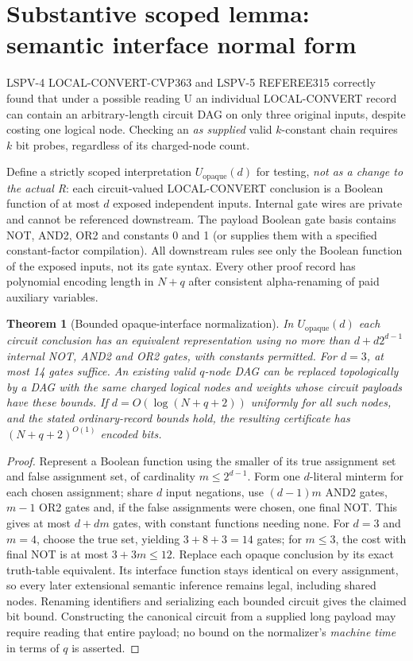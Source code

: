 \documentclass[11pt]{article}
\newtheorem{theorem}{Theorem}
\begin{document}
\section*{Substantive scoped lemma: semantic interface normal form}
LSPV-4 LOCAL-CONVERT-CVP363 and LSPV-5 REFEREE315 correctly found that under a possible reading U an individual LOCAL-CONVERT record can contain an arbitrary-length circuit DAG on only three original inputs, despite costing one logical node. Checking an \emph{as supplied} valid $k$-constant chain requires $k$ bit probes, regardless of its charged-node count.

Define a strictly scoped interpretation $U_{\mathrm{opaque}}(d)$ for testing, \emph{not as a change to the actual R}: each circuit-valued LOCAL-CONVERT conclusion is a Boolean function of at most $d$ exposed independent inputs. Internal gate wires are private and cannot be referenced downstream. The payload Boolean gate basis contains NOT, AND2, OR2 and constants 0 and 1 (or supplies them with a specified constant-factor compilation). All downstream rules see only the Boolean function of the exposed inputs, not its gate syntax. Every other proof record has polynomial encoding length in $N+q$ after consistent alpha-renaming of paid auxiliary variables.

\begin{theorem}[Bounded opaque-interface normalization]
In $U_{\mathrm{opaque}}(d)$ each circuit conclusion has an equivalent representation using no more than $d+d2^{d-1}$ internal NOT, AND2 and OR2 gates, with constants permitted. For $d=3$, at most 14 gates suffice. An existing valid $q$-node DAG can be replaced topologically by a DAG with \emph{the same charged logical nodes and weights} whose circuit payloads have these bounds. If $d=O(\log(N+q+2))$ uniformly for all such nodes, and the stated ordinary-record bounds hold, the resulting certificate has $(N+q+2)^{O(1)}$ encoded bits.
\end{theorem}
\begin{proof}
Represent a Boolean function using the smaller of its true assignment set and false assignment set, of cardinality $m\le2^{d-1}$. Form one $d$-literal minterm for each chosen assignment; share $d$ input negations, use $(d-1)m$ AND2 gates, $m-1$ OR2 gates and, if the false assignments were chosen, one final NOT. This gives at most $d+dm$ gates, with constant functions needing none. For $d=3$ and $m=4$, choose the true set, yielding $3+8+3=14$ gates; for $m\le3$, the cost with final NOT is at most $3+3m\le12$. Replace each opaque conclusion by its exact truth-table equivalent. Its interface function stays identical on every assignment, so every later extensional semantic inference remains legal, including shared nodes. Renaming identifiers and serializing each bounded circuit gives the claimed bit bound. Constructing the canonical circuit from a supplied long payload may require reading that entire payload; no bound on the normalizer's \emph{machine time} in terms of $q$ is asserted.
\end{proof}
\end{document}
